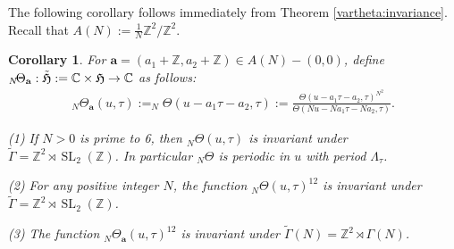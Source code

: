 \documentclass[12pt,amstex,amssymb]{article}
\theoremstyle{plain}
\newtheorem{corollary}[theorem]{Corollary}
\theoremstyle{definition}
\def\fH{{\frak H}}
\def\Z{{\mathbb Z}}
\def\C{{\mathbb C}}
\newcommand{\be}{\begin{eqnarray*}}
\newcommand{\ee}{\end{eqnarray*}}
\newcommand{\bea}{\begin{eqnarray}}
\newcommand{\eea}{\end{eqnarray}}
\newcommand{\SL}{\operatorname{SL}}
\newcommand{\ba}{\mathbf{a}}
\newcommand{\tfH}{\tilde{\mathfrak{H}}}
\begin{document}
The following corollary follows immediately from Theorem \ref{vartheta:invariance}. Recall that $A(N):=\frac{1}{N}\Z^2/\Z^2$.  
\medskip
\begin{corollary}\label{periodic}
	For $\ba=(a_1+\Z,a_2+\Z) \in A(N)-(0,0)$, define $_{N}\!\Theta_{\ba}: \tfH := \C\times \fH \to \C$ as follows:
	\bea\label{cdiv}
	_{N}\!\Theta_{\ba}(u,\tau):=_{N}\!\Theta (u-a_1\tau-a_2, \tau):=\frac{\Theta(u-a_1\tau-a_2,\tau)^{N^2}}{\Theta(Nu-Na_1\tau-Na_2,\tau)}.
	\eea
	
	(1)
	If $N >0$ is prime to 6, then $_N\Theta(u,\tau)$ is invariant under $\tilde\Gamma=\Z^2 \rtimes \SL_2(\Z)$. In particular $_{N}\!\Theta$ is periodic in $u$ with period $\Lambda_\tau$.
	
	(2) For any positive integer $N$, the function $_N\Theta(u,\tau)^{12}$ is invariant under $\tilde\Gamma=\Z^2 \rtimes \SL_2(\Z)$.
	
	(3) 
	The function $_{N}\!\Theta_{\ba}(u,\tau)^{12}$ is invariant
	under $\tilde \Gamma(N)=\Z^2 \rtimes \Gamma(N)$.
	
\end{corollary}
\end{document}
